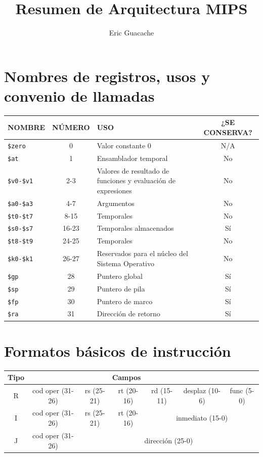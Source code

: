 \documentclass[12pt,a4paper]{article}
\title{Resumen de Arquitectura MIPS}
\author{Eric Guacache}
\date{}
\begin{document}
	
	\maketitle
	
	\section*{Nombres de registros, usos y convenio de llamadas}
	
	\begin{table}[H]
		\centering
		\small
		\begin{tabularx}{\textwidth}{l | c | X | c}
			\toprule
			\textbf{NOMBRE} & \textbf{NÚMERO} & \textbf{USO} & \textbf{¿SE CONSERVA?} \\
			\midrule
			\texttt{\$zero} & 0 & Valor constante 0 & N/A \\
			\midrule
			\texttt{\$at} & 1 & Ensamblador temporal & No \\
			\midrule
			\texttt{\$v0-\$v1} & 2-3 & Valores de resultado de funciones y evaluación de expresiones & No \\
			\midrule
			\texttt{\$a0-\$a3} & 4-7 & Argumentos & No \\
			\midrule
			\texttt{\$t0-\$t7} & 8-15 & Temporales & No \\
			\midrule
			\texttt{\$s0-\$s7} & 16-23 & Temporales almacenados & Sí \\
			\midrule
			\texttt{\$t8-\$t9} & 24-25 & Temporales & No \\
			\midrule
			\texttt{\$k0-\$k1} & 26-27 & Reservados para el núcleo del Sistema Operativo & No \\
			\midrule
			\texttt{\$gp} & 28 & Puntero global & Sí \\
			\midrule
			\texttt{\$sp} & 29 & Puntero de pila & Sí \\
			\midrule
			\texttt{\$fp} & 30 & Puntero de marco & Sí \\
			\midrule
			\texttt{\$ra} & 31 & Dirección de retorno & Sí \\
			\bottomrule
		\end{tabularx}
	\end{table}
	
	\section*{Formatos básicos de instrucción}
	
	\begin{table}[H] 
		\centering
		\begin{tabular}{c|c|c|c|c|c|c}
			\toprule
			\textbf{Tipo} & \multicolumn{5}{c}{\textbf{Campos}} & \\
			\midrule
			R & cod oper (31-26) & rs (25-21) & rt (20-16) & rd (15-11) & desplaz (10-6) & func (5-0) \\
			\midrule
			I & cod oper (31-26) & rs (25-21) & rt (20-16) & \multicolumn{3}{c}{inmediato (15-0)} \\
			\midrule
			J & cod oper (31-26) & \multicolumn{5}{c}{dirección (25-0)} \\
			\bottomrule
		\end{tabular}
	\end{table}
	
\end{document}
